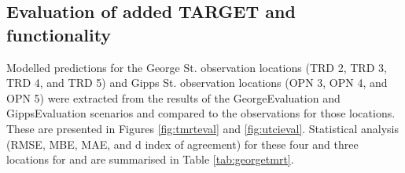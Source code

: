 \documentclass[final,3p,times,authoryear]{elsarticle}
\begin{document}
\subsection{Evaluation of added TARGET  and  functionality}


Modelled predictions for the George St. observation locations (TRD 2, TRD 3, TRD 4, and TRD 5) and Gipps St. observation locations (OPN 3, OPN 4, and OPN 5) were extracted from the results of the GeorgeEvaluation and GippsEvaluation scenarios and compared to the observations for those locations. These are presented in Figures \ref{fig:tmrteval} and \ref{fig:utcieval}. Statistical analysis (RMSE, MBE, MAE, and d index of agreement) for these four and three locations for  and  are summarised in Table \ref{tab:georgetmrt}.
\end{document}
